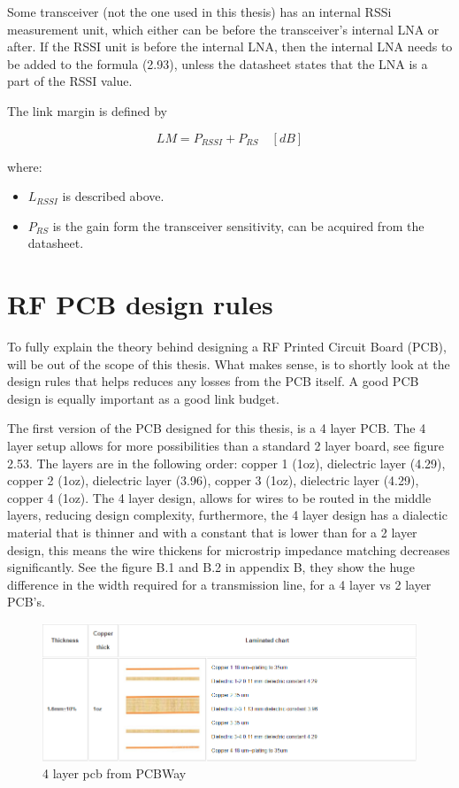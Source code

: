 Some transceiver (not the one used in this thesis) has an internal RSSi measurement unit, which either can be before the transceiver's internal LNA or after. If the RSSI unit is before the internal LNA, then the internal LNA needs to be added to the formula (2.93), unless the datasheet states that the LNA is a part of the RSSI value. 

The link margin is defined by 

\begin{equation}
   LM = P_{RSSI}+P_{RS} \quad [dB]
\end{equation}

where:

\begin{itemize}
    \item $L_{RSSI}$ is described above.
    \item $P_{RS}$ is the gain form the transceiver sensitivity, can be acquired from the datasheet.
\end{itemize}

\section{RF PCB design rules}
To fully explain the theory behind designing a RF Printed Circuit Board (PCB), will be out of the scope of this thesis. What makes sense, is to shortly look at the design rules that helps reduces any losses from the PCB itself. A good PCB design is equally important as a good link budget.  

The first version of the PCB designed for this thesis, is a 4 layer PCB. The 4 layer setup allows for more possibilities than a standard 2 layer board, see figure 2.53. The layers are in the following order: copper 1 (1oz), dielectric layer (4.29), copper 2 (1oz), dielectric layer (3.96), copper 3 (1oz), dielectric layer (4.29), copper 4 (1oz). The 4 layer design, allows for wires to be routed in the middle layers, reducing design complexity, furthermore, the 4 layer design has a dialectic material that is thinner and with a constant that is lower than for a 2 layer design, this means the wire thickens for microstrip impedance matching decreases significantly. See the figure B.1 and B.2 in appendix B, they show the huge difference in the width required for a transmission line, for a 4 layer vs 2 layer PCB's.   

\begin{figure}[h]
\centering
\includegraphics[scale=0.8]{figures/PCB4.PNG}
\caption{4 layer pcb from PCBWay \cite{PCB}}
\end{figure}

